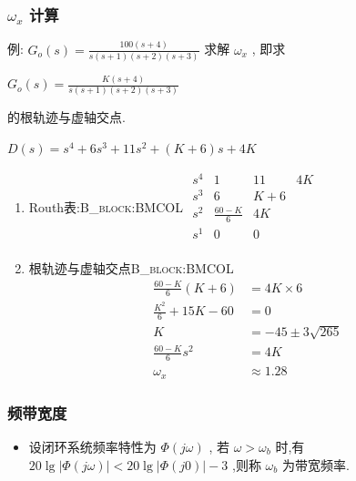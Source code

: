 \documentclass[table]{article}
\begin{document}
\subsubsection{\(\omega_x\) 计算}
\label{sec:org0691b81}
例: \(G_o(s)=\frac{100(s+4)}{s(s+1)(s+2)(s+3)}\) 求解 \(\omega_x\) , 即求 

\(G_o(s)=\frac{K(s+4)}{s(s+1)(s+2)(s+3)}\) 

的根轨迹与虚轴交点.

\(D(s)=s^4+6s^3+11s^2+(K+6)s+4K\)

\begin{enumerate}
\item Routh表:\hfill{}\textsc{B\_block:BMCOL}
\label{sec:orgbf11488}
\begin{math}
\begin{matrix}
s^4 & 1  & 11     & 4K \\
s^3 & 6  & K+6  \\
s^2 & \frac{60-K}{6} & 4K \\
s^1 & 0 & 0 \\
\end{matrix}
\end{math}

\item 根轨迹与虚轴交点\hfill{}\textsc{B\_block:BMCOL}
\label{sec:org3d5d606}
\begin{align*}
\frac{60-K}{6}(K+6) &=4K\times 6 \\
\frac{K^2}{6}+15K-60 &=0\\
K&=-45\pm 3\sqrt{265}\\
\frac{60-K}{6}s^2 &= 4K\\
\omega_x &\approx 1.28
\end{align*}
\end{enumerate}
\subsubsection{频带宽度}
\label{sec:org5f85683}
\begin{itemize}
\item 设闭环系统频率特性为 \(\Phi(j\omega)\) , 若 \(\omega>\omega_b\) 时,有 \(20\lg|\Phi(j\omega)| <20\lg|\Phi(j0)|-3\) ,则称 \(\omega_b\) 为带宽频率.

\end{itemize}
\end{document}
